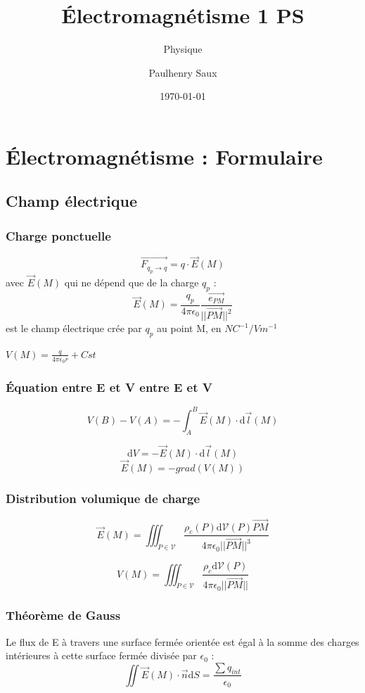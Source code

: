 \documentclass[french]{yLectureNote}
\title{Électromagnétisme 1 PS}
\subtitle{Physique}
\author{Paulhenry Saux}
\date{\today}
\renewcommand{\vec}{\overrightarrow}
\newcommand{\dd}{\mathrm{d}}
\newcommand{\norm}[1]{||\vec{#1}||}
\newcommand{\E}{\vec{E}(M)}
\newcommand{\V}{V(M)}
\newcommand{\mv}{\mathcal{V}}
\begin{document}
\setcounter{chapter}{-1}
\chapter{Électromagnétisme : Formulaire}
\section{Champ électrique}
\subsection{Charge ponctuelle}
\begin{definition}
\[\vec{F_{q_p\to q}} = q \cdot \E\] avec \(\E\) qui ne dépend que de la charge \(q_p\) : \[\E = \frac{q_p}{4\pi\epsilon_0}\frac{\vec{e_{PM}}}{\norm{PM}^2}\] est le champ électrique crée par \(q_p\) au point M, en \(NC^{-1} / Vm^{-1}\)
\end{definition}
\begin{definition}
\(V(M) = \frac{q}{4\pi\epsilon_0 r} + Cst\)
\end{definition}
\subsection{Équation entre E et V entre E et V}
\begin{theorem}
\[V(B)-V(A) = -\int_A^B\E\cdot \dd \vec{l}(M)\]
\end{theorem}
\begin{theorem}
\[\dd V = -\E\cdot \dd \vec{l}(M)\]
\[\E = -grad(\V)\]
\end{theorem}
\subsection{Distribution volumique de charge}
\begin{theorem}
\[\E = \iiint_{P\in\mv} \frac{\rho_c(P)\dd \mv(P)\vec{PM}}{4\pi\epsilon_0 \norm{PM}^3}\]
 \end{theorem}
 \begin{theorem}
\[V(M) = \iiint_{P\in \mv} \frac{\rho_c \dd \mv(P)}{4\pi\epsilon_0 \norm{PM}}\]
 \end{theorem}
\subsection{Théorème de Gauss}
\begin{theorem}
Le flux de E à travers une surface fermée orientée est égal à la somme des charges intérieures à cette surface fermée divisée par \(\epsilon_0\) :
\[\iint \E\cdot \vec{n}\dd S = \frac{\sum q_{int}}{\epsilon_0}\]
\end{theorem}
\end{document}
